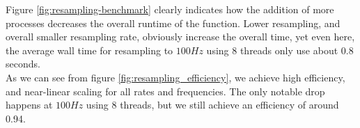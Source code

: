 Figure \ref{fig:resampling-benchmark} clearly indicates how the addition of more processes decreases the overall runtime of the function. Lower resampling, and overall smaller resampling rate, obviously increase the overall time, yet even here, the average wall time for resampling to $100Hz$ using 8 threads only use about 0.8 seconds. \\


As we can see from figure \ref{fig:resampling_efficiency}, we achieve high efficiency, and near-linear scaling for all rates and frequencies. The only notable drop happens at $100Hz$ using 8 threads, but we still achieve an efficiency of around 0.94. 
